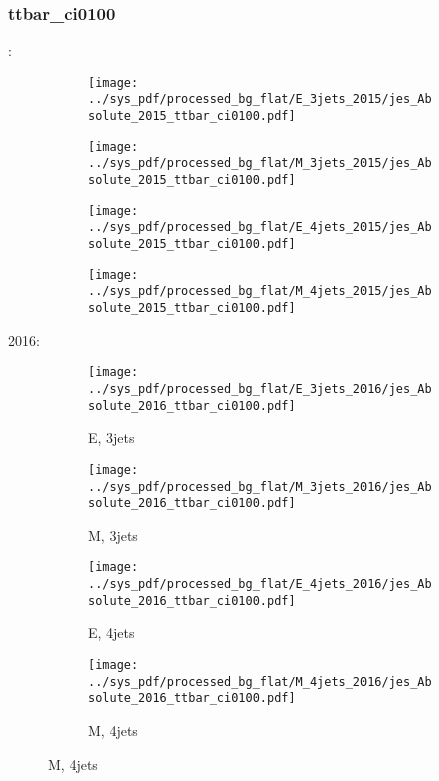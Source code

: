 \documentclass{beamer}
\begin{document}
\begin{frame}
\frametitle{ttbar_ci0100}
\fontsize{5}{1}:
\begin{figure}
\centering
\begin{subfigure}[b]{0.24\textwidth}
\texttt{[image: ../sys\_pdf/processed\_bg\_flat/E\_3jets\_2015/jes\_Absolute\_2015\_ttbar\_ci0100.pdf]}
\end{subfigure}
\begin{subfigure}[b]{0.24\textwidth}
\texttt{[image: ../sys\_pdf/processed\_bg\_flat/M\_3jets\_2015/jes\_Absolute\_2015\_ttbar\_ci0100.pdf]}
\end{subfigure}
\begin{subfigure}[b]{0.24\textwidth}
\texttt{[image: ../sys\_pdf/processed\_bg\_flat/E\_4jets\_2015/jes\_Absolute\_2015\_ttbar\_ci0100.pdf]}
\end{subfigure}
\begin{subfigure}[b]{0.24\textwidth}
\texttt{[image: ../sys\_pdf/processed\_bg\_flat/M\_4jets\_2015/jes\_Absolute\_2015\_ttbar\_ci0100.pdf]}
\end{subfigure}
\end{figure}
2016:
\begin{figure}
\centering
\begin{subfigure}[b]{0.24\textwidth}
\texttt{[image: ../sys\_pdf/processed\_bg\_flat/E\_3jets\_2016/jes\_Absolute\_2016\_ttbar\_ci0100.pdf]}
\captionsetup{font=tiny}
\caption{E, 3jets}
\end{subfigure}
\begin{subfigure}[b]{0.24\textwidth}
\texttt{[image: ../sys\_pdf/processed\_bg\_flat/M\_3jets\_2016/jes\_Absolute\_2016\_ttbar\_ci0100.pdf]}
\captionsetup{font=tiny}
\caption{M, 3jets}
\end{subfigure}
\begin{subfigure}[b]{0.24\textwidth}
\texttt{[image: ../sys\_pdf/processed\_bg\_flat/E\_4jets\_2016/jes\_Absolute\_2016\_ttbar\_ci0100.pdf]}
\captionsetup{font=tiny}
\caption{E, 4jets}
\end{subfigure}
\begin{subfigure}[b]{0.24\textwidth}
\texttt{[image: ../sys\_pdf/processed\_bg\_flat/M\_4jets\_2016/jes\_Absolute\_2016\_ttbar\_ci0100.pdf]}
\captionsetup{font=tiny}
\caption{M, 4jets}
\end{subfigure}
\end{figure}
\end{frame}
\end{document}
